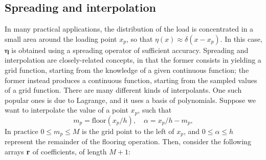 \subsection{Spreading and interpolation}
In many practical applications, the distribution of the load is concentrated in a small area around the loading point $x_p$, so that $\eta(x) \approx \delta(x-x_p)$. In this case, $\boldsymbol \eta$ is obtained using a spreading operator of sufficient accuracy. Spreading and interpolation are closely-related concepts, in that the former consists in yielding a grid function, starting from the knowledge of a given continuous function; the former instead produces a continuous function, starting from the sampled values of a grid function. There are many different kinds of interpolants. One such popular ones is due to Lagrange, and it uses a basis of polynomials. Suppose we want to interpolate the value of a point $x_p$, such that 
\begin{equation}
m_p = \text{floor}(x_p/h), \quad \alpha = x_p/h - m_p,
\end{equation}
In practice $0\leq m_p\leq M$ is the grid point to the left of $x_p$, and $0\leq \alpha \leq h$ represent the remainder of the flooring operation. Then, consider the following arrays ${\bf r}$ of coefficients, of length $M+1$:
